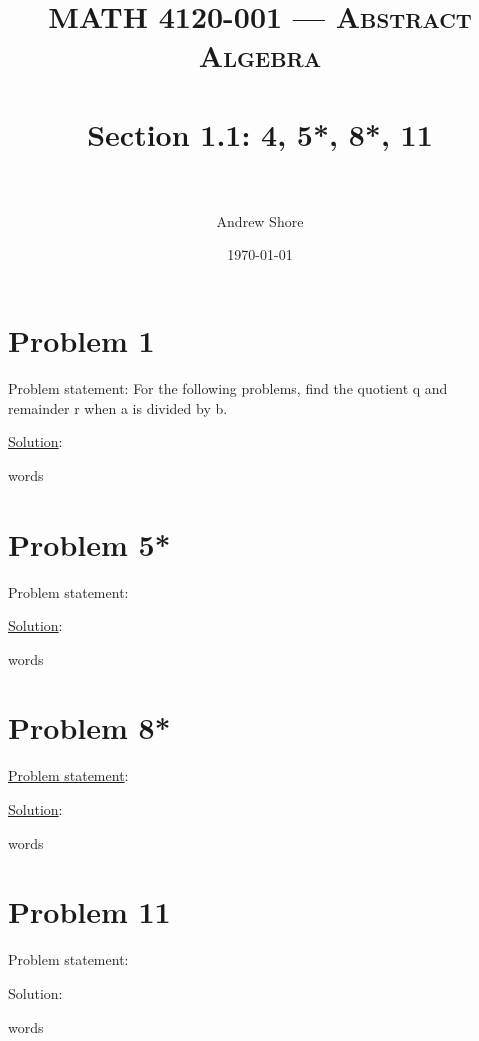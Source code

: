 \documentclass{article} %
\title{ 
\normalfont \normalsize 
\textsc{MATH 4120-001 --- Abstract Algebra} \\
\horrule{0.5pt} \\[0cm] %
\huge Section 1.1: 4, 5*, 8*, 11 \\ %
\horrule{2pt} \\[0cm] %
}
\author{Andrew Shore} %
\date{\normalsize\today} %
\begin{document}
\maketitle %

\section*{Problem 1}

Problem statement: For the following problems, find the quotient q and remainder r when a is divided by b.

\underline{Solution}: \\
\begin{addmargin}[1em]{0em}
words
\end{addmargin}    


\section*{Problem 5*}

Problem statement: 


\underline{Solution}: \\
\begin{addmargin}[1em]{0em}
words
\end{addmargin}



\section*{Problem 8*}

\underline{Problem statement}: 


\underline{Solution}: \\
\begin{addmargin}[1em]{0em}
words
\end{addmargin}


\section*{Problem 11}

Problem statement: 

Solution: \\
\begin{addmargin}[1em]{0em}
words
\end{addmargin}

\end{document}
